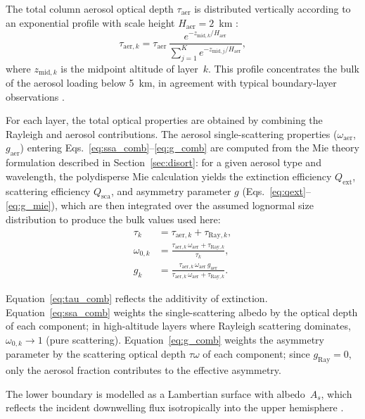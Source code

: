\documentclass[a4paper, 11pt]{article}
\begin{document}
The total column aerosol optical depth $\tau_{\text{aer}}$ is
distributed vertically according to an exponential profile with scale
height $H_{\text{aer}} = 2$~km \cite{liou2002,seinfeld2016}:
%
\begin{equation}
  \tau_{\text{aer},k}
  = \tau_{\text{aer}}\,
    \frac{e^{-z_{\text{mid},k}/H_{\text{aer}}}}
    {\sum_{j=1}^{K} e^{-z_{\text{mid},j}/H_{\text{aer}}}},
  \label{eq:aer_profile}
\end{equation}
%
where $z_{\text{mid},k}$ is the midpoint altitude of layer~$k$.  This
profile concentrates the bulk of the aerosol loading below 5~km, in
agreement with typical boundary-layer observations
\cite{liou2002}.

For each layer, the total optical properties are obtained by combining
the Rayleigh and aerosol contributions.  The aerosol single-scattering
properties ($\omega_{\text{aer}}$, $g_{\text{aer}}$) entering
Eqs.~\eqref{eq:ssa_comb}--\eqref{eq:g_comb} are computed from the Mie
theory formulation described in Section~\ref{sec:disort}: for a given
aerosol type and wavelength, the polydisperse Mie calculation yields
the extinction efficiency $Q_{\text{ext}}$, scattering efficiency
$Q_{\text{sca}}$, and asymmetry parameter $g$ (Eqs.~\ref{eq:qext}--\ref{eq:g_mie}),
which are then integrated over the assumed lognormal size distribution
to produce the bulk values used here:
%
\begin{align}
  \tau_k &= \tau_{\text{aer},k} + \tau_{\text{Ray},k},
  \label{eq:tau_comb}\\[3pt]
  \omega_{0,k} &= \frac{\tau_{\text{aer},k}\,\omega_{\text{aer}}
  + \tau_{\text{Ray},k}}{\tau_k},
  \label{eq:ssa_comb}\\[3pt]
  g_k &= \frac{\tau_{\text{aer},k}\,\omega_{\text{aer}}\,g_{\text{aer}}}
  {\tau_{\text{aer},k}\,\omega_{\text{aer}} + \tau_{\text{Ray},k}}.
  \label{eq:g_comb}
\end{align}

Equation~\eqref{eq:tau_comb} reflects the additivity of extinction.
Equation~\eqref{eq:ssa_comb} weights the single-scattering albedo by
the optical depth of each component; in high-altitude layers where
Rayleigh scattering dominates, $\omega_{0,k} \to 1$ (pure scattering).
Equation~\eqref{eq:g_comb} weights the asymmetry parameter by the
scattering optical depth $\tau\omega$ of each component; since
$g_{\text{Ray}} = 0$, only the aerosol fraction contributes to the
effective asymmetry.

The lower boundary is modelled as a Lambertian surface with
albedo~$A_s$, which reflects the incident downwelling flux isotropically
into the upper hemisphere \cite{disortreport}.
\end{document}
